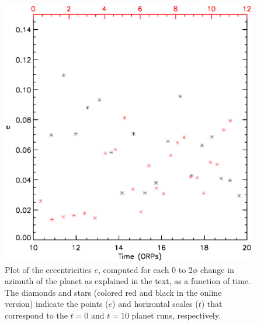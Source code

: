\documentclass[12pt,manuscript,authoryear]{aastex}
\begin{document}
\begin{figure}[t]
\center
\includegraphics[width=12cm]{Figures/planete.eps}
\caption{Plot of the eccentricities $e$, computed for each 0 to 2$\phi$ change in azimuth of the planet as explained in
  the text, as a function of time. The diamonds and stars (colored red and black in the online version) indicate the
  points ($e$) and horizontal scales ($t$) that correspond to the $t = 0$ and $t = 10$ planet runs, respectively.}
\label{fig:e}
\end{figure}


\label{lastpage}
\end{document}
